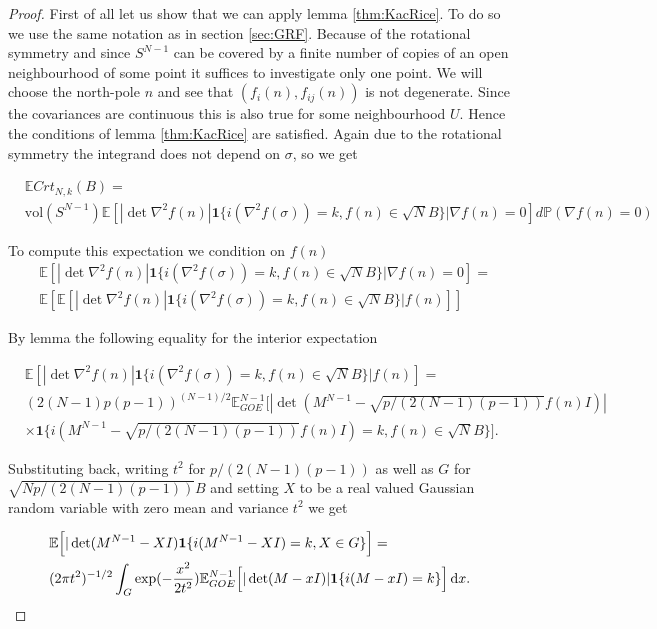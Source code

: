 \begin{proof}
First of all let us show that we can apply lemma \ref{thm:KacRice}. To do so we use the same notation as in section \ref{sec:GRF}. Because of the rotational symmetry and since $S^{N-1}$ can be covered by a finite number of copies of an open neighbourhood of some point it suffices to investigate only one point. We will choose the north-pole $n$ and see that $(f_i(n),f_{ij}(n))$ is not degenerate. Since the covariances are continuous this is also true for some neighbourhood $U$. Hence the conditions of lemma \ref{thm:KacRice} are satisfied. Again due to the rotational symmetry the integrand does not depend on $\sigma$, so we get

\begin{align*}
	&\mathbb E Crt_{N,k}(B)=\\
	&\text{vol}(S^{N-1})\mathbb E[|\det\nabla^2 f(n)|\mathbf 1\{i(\nabla^2 f(\sigma))=k, f(n)\in\sqrt NB\}|\nabla f(n)=0]d\mathbb P(\nabla f(n)=0)
\end{align*}

To compute this expectation we condition on $f(n)$
\begin{align*}
	&\mathbb E[|\det\nabla^2 f(n)|\mathbf 1\{i(\nabla^2 f(\sigma))=k, f(n)\in\sqrt NB\}|\nabla f(n)=0]=\\
	&\mathbb E\left[\mathbb E[|\det\nabla^2 f(n)|\mathbf 1\{i(\nabla^2 f(\sigma))=k,f(n)\in\sqrt NB\}|f(n)]\right]
\end{align*}

By lemma the following equality for the interior expectation

\begin{align*}
	&\mathbb E[|\det\nabla^2 f(n)|\mathbf 1\{i(\nabla^2 f(\sigma))=k,f(n)\in\sqrt NB\}|f(n)]=\\
	&(2(N-1)p(p-1))^{(N-1)/2}\mathbb E_{GOE}^{N-1}\Big[|\det(M^{N-1}-\sqrt{p/(2(N-1)(p-1))}f(n)I)|\\&\times\mathbf 1\{i(M^{N-1}-\sqrt{p/(2(N-1)(p-1))}f(n)I)=k,f(n)\in\sqrt NB\}\Big].
\end{align*}

Substituting back, writing $t^2$ for $p/(2(N-1)(p-1))$ as well as $G$ for $\sqrt{Np/(2(N-1)(p-1))}B$ and setting $X$ to be a real valued Gaussian random variable with zero mean and variance $t^2$ we get 

\begin{align}\label{eq:expressEintermsofEGOE}
	&\mathbb E\Big[|\det(M^{N-1}-XI)\mathbf 1\{i(M^{N-1}-XI)=k,X\in G\}\Big]=\nonumber\\
	&(2\pi t^2)^{-1/2}\int_G\exp(-\frac{x^2}{2t^2})\mathbb E_{GOE}^{N-1}\Big[|\det(M-xI)|\mathbf 1\{i(M-xI)=k\}\Big]\mathop{}\!\mathrm{d} x.
\end{align}


\end{proof}
